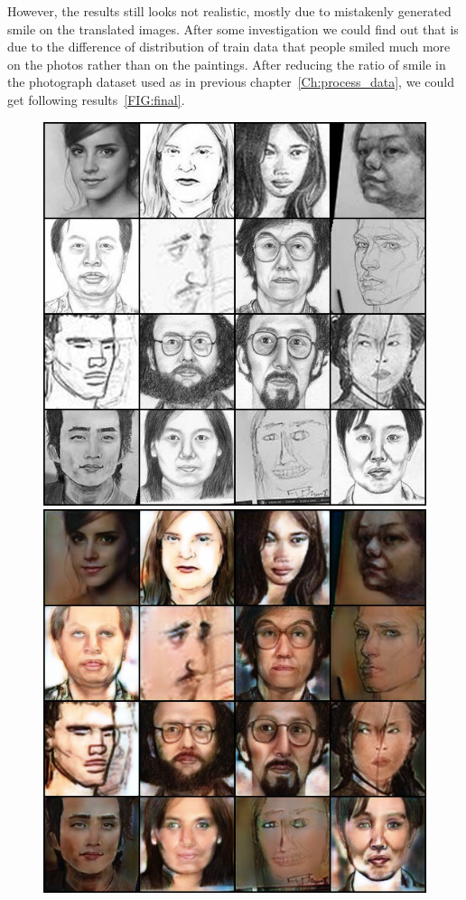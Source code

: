 However, the results still looks not realistic, mostly due to mistakenly generated smile on the translated images. After some investigation we could find out that is due to the difference of distribution of train data that people smiled much more on the photos rather than on the paintings.
After reducing the ratio of smile in the photograph dataset used as in previous chapter~\ref{Ch:process_data}, we could get following results~\ref{FIG:final}.

\begin{figure}[ht]
    \begin{center}
    \includegraphics[scale=0.32]{Graphics/ske2pic_origin_final.png}
    \includegraphics[scale=0.32]{Graphics/ske2pic_result_final.png}


\end{center}
\end{figure}
